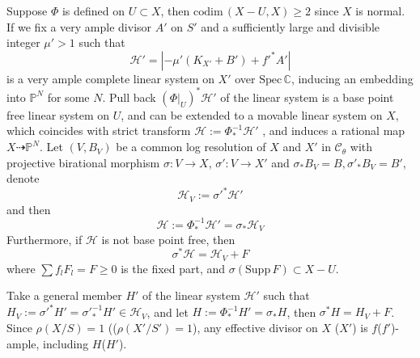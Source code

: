 \documentclass{article}
\begin{document}
Suppose $ \Phi $ is defined on $ U\subset X $, then $ \mathrm{codim}\,(X-U,X)\geqslant 2 $ since $ X $ is normal. If we fix a very ample divisor $ A'  $ on $ S' $ and a sufficiently large and divisible integer $ \mu'>1 $ such that 
$$ \mathcal{H}'=|-\mu' (K_{X'}+B') +f'^*A'| $$
is a very ample complete linear system on $ X' $ over $ \mathrm{Spec}\,\mathbb{C} $,  inducing an embedding into $ \mathbb{P}^N $ for some $ N $. Pull back $ (\Phi|_U)^*\mathcal{H}' $ of the linear system is a base point free linear system on $ U $, and can be extended  to a movable linear system on $ X $, which coincides with strict transform $ \mathcal{H}:=\Phi^{-1}_*\mathcal{H}' $ , and induces a rational map $ X\dashrightarrow \mathbb{P}^N $. Let $ (V,B_V) $ be a common log resolution of $ X $ and $ X' $ in $ \mathcal{C}_\theta $ with projective birational morphism $ \sigma:V\to X$,   $\sigma':V\to X' $ and $\sigma_*B_V=B, \sigma'_*B_V=B' $, denote
$$ \mathcal{H}_V:=\sigma'^*\mathcal{H}' $$
and then 
$$ \mathcal{H}:=\Phi^{-1}_*\mathcal{H}'=\sigma_*\mathcal{H}_V $$
Furthermore, if $ \mathcal{H} $ is not base point free, then
$$ \sigma^*\mathcal{H}=\mathcal{H}_V+F $$
where $ \sum f_lF_l=F\geqslant0 $ is the fixed part, and $ \sigma(\mathrm{Supp}\,F)\subset X-U $. 

Take a general member $ H' $ of the linear system $ \mathcal{H}' $ such that $ H_V:=\sigma'^*H'=\sigma'^{-1}_*H'\in \mathcal{H}_V $, and let $ H:=\Phi^{-1}_*H'=\sigma_*H $, then $ \sigma^*H=H_V+F $. Since $ \rho(X/S)=1 $ (($\rho( X'/S')=1 $), any effective divisor on $ X $ ($ X' $) is $ f $($ f' $)-ample, including $ H $($ H' $). 
\end{document}
